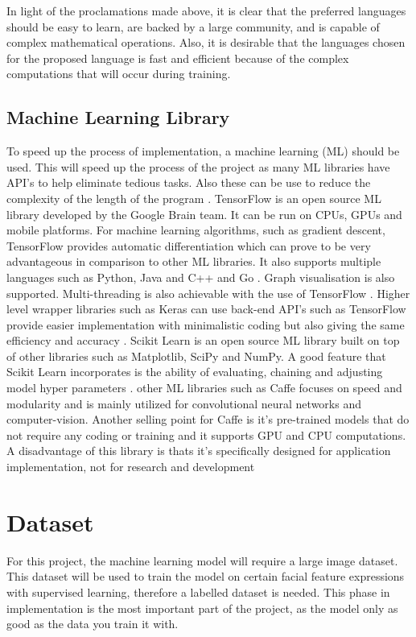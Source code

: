 In light of the proclamations made above, it is clear that the preferred languages should be easy to learn, are backed by a large community, and is capable of complex mathematical operations. Also, it is desirable that the languages chosen for the proposed language is fast and efficient because of the complex computations that will occur during training.

\newpage

\subsection{Machine Learning Library}
To speed up the process of implementation, a machine learning (ML) should be used. This will speed up the process of the project as many ML libraries have API's to help eliminate tedious tasks. Also these can be use to reduce the complexity of the length of the program \citep{jain}.
TensorFlow is an open source ML library developed by the Google Brain team. It can be run on CPUs, GPUs and mobile platforms. For machine learning algorithms, such as gradient descent, TensorFlow provides automatic differentiation which can prove to be very advantageous in comparison to other ML libraries. It also supports multiple languages such as Python, Java and C++ and Go \citep{jain}. Graph visualisation is also supported. Multi-threading is also achievable with the use of TensorFlow \citep{jain}. Higher level wrapper libraries such as Keras can use back-end API's such as TensorFlow provide easier implementation with minimalistic coding but also giving the same efficiency and accuracy \citep{lee_keras}. Scikit Learn is an open source ML library built on top of other libraries such as Matplotlib, SciPy and NumPy. A good feature that Scikit Learn incorporates is the ability of evaluating, chaining and adjusting model hyper parameters \citep{jain}.
other ML libraries such as Caffe focuses on speed and modularity and is mainly utilized for convolutional neural networks and computer-vision. Another selling point for Caffe is it’s pre-trained models that do not require any coding or training and it supports GPU and CPU computations. A disadvantage of this library is thats it's specifically designed for application implementation, not for research and development \citep{jain}

\section{Dataset}
For this project, the machine learning model will require a large image dataset. This dataset will be used to train the model on certain facial feature expressions with supervised learning, therefore a labelled dataset is needed. This phase in implementation is the most important part of the project, as the model only as good as the data you train it with.

